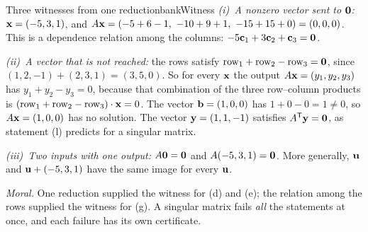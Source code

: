 \documentclass[11pt]{article}
\begin{document}
\begin{exmp}{Three witnesses from one reduction}{bankWitness}
\emph{(i)~A nonzero vector sent to $\mathbf{0}$:} $\mathbf{x}=(-5,3,1)$, and $A\bv{x}=(-5+6-1,\ -10+9+1,\ -15+15+0)=(0,0,0)$. This is a dependence relation among the columns: $-5\mathbf{c}_1+3\mathbf{c}_2+\mathbf{c}_3=\mathbf{0}$.

\emph{(ii)~A vector that is not reached:} the rows satisfy $\text{row}_1+\text{row}_2-\text{row}_3=\mathbf{0}$, since $(1,2,-1)+(2,3,1)=(3,5,0)$. So for every $\mathbf{x}$ the output $A\mathbf{x}=(y_1,y_2,y_3)$ has $y_1+y_2-y_3=0$, because that combination of the three row--column products is $(\text{row}_1+\text{row}_2-\text{row}_3)\cdot\mathbf{x}=0$. The vector $\mathbf{b}=(1,0,0)$ has $1+0-0=1\neq0$, so $A\mathbf{x}=(1,0,0)$ has no solution. The vector $\mathbf{y}=(1,1,-1)$ satisfies $A^{\mathsf T}\mathbf{y}=\mathbf{0}$, as statement (l) predicts for a singular matrix.

\emph{(iii)~Two inputs with one output:} $A\mathbf{0}=\mathbf{0}$ and $A(-5,3,1)=\mathbf{0}$. More generally, $\mathbf{u}$ and $\mathbf{u}+(-5,3,1)$ have the same image for every $\mathbf{u}$.

\emph{Moral.} One reduction supplied the witness for (d) and (e); the relation among the rows supplied the witness for (g). A singular matrix fails \emph{all} the statements at once, and each failure has its own certificate.
\end{exmp}
\end{document}
